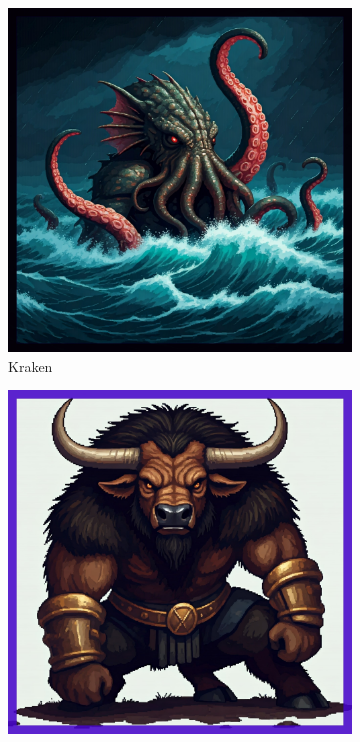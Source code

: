 \documentclass{article}
\begin{document}
\begin{figure}[h!]
    \begin{subfigure}[b]{0.3\textwidth}
        \centering
        \includegraphics[width=\textwidth]{gachas/final/Kraken (legendary).jpg}
        \caption{Kraken}
        \label{fig:kraken}
    \end{subfigure}
    \hfill
    \begin{subfigure}[b]{0.3\textwidth}
        \centering
        \includegraphics[width=\textwidth]{gachas/final/Minotaur (epic).jpg}

\end{subfigure}
\end{figure}
\end{document}

